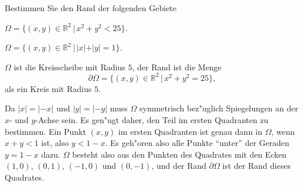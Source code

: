 Bestimmen Sie den Rand der folgenden Gebiete
\begin{teilaufgaben}
\item
$\Omega=\{(x,y)\in\mathbb R^2\,|\, x^2+y^2<25\}$.
\item
$\Omega=\{(x,y)\in\mathbb R^2\,|\, |x|+|y|=1\}$.
\end{teilaufgaben}

\begin{loesung}
\begin{teilaufgaben}
\item
$\Omega$ ist die Kreisscheibe mit Radius $5$, der Rand ist die Menge
\[
\partial\Omega=\{(x,y)\in\mathbb R^2\,|\, x^2+y^2=25\},
\]
als ein Kreis mit Radius $5$.
\item
Da $|x|=|-x|$ und $|y|=|-y|$ muss $\Omega$ symmetrisch bez"uglich
Spiegelungen an der $x$- und $y$-Achse sein. Es gen"ugt daher,
den Teil im ersten Quadranten zu bestimmen.  Ein Punkt $(x,y)$
im ersten Quadranten ist genau dann in $\Omega$, wenn $x+y<1$ ist,
also $y<1-x$. Es geh"oren also alle Punkte ``unter'' der Geraden
$y=1-x$ dazu. $\Omega$ besteht also aus den Punkten des
Quadrates mit den Ecken $(1,0)$, $(0,1)$, $(-1,0)$ und $(0,-1)$,
und der Rand $\partial\Omega$ ist der Rand dieses Quadrates.
\end{teilaufgaben}
\end{loesung}
